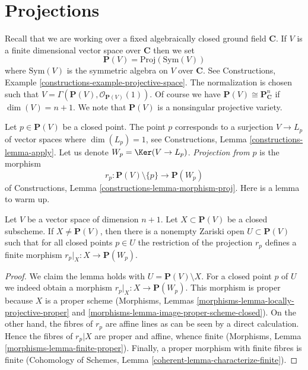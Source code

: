 \section{Projections}
\label{section-projection}

\noindent
Recall that we are working over a fixed algebraically closed ground field
$\mathbf{C}$. If $V$ is a finite dimensional vector space over $\mathbf{C}$
then we set
$$
\mathbf{P}(V) = \text{Proj}(\text{Sym}(V))
$$
where $\text{Sym}(V)$ is the symmetric algebra on $V$ over $\mathbf{C}$.
See Constructions, Example \ref{constructions-example-projective-space}.
The normalization is chosen such that
$V = \Gamma(\mathbf{P}(V), \mathcal{O}_{\mathbf{P}(V)}(1))$.
Of course we have $\mathbf{P}(V) \cong \mathbf{P}^n_{\mathbf{C}}$ if
$\dim(V) = n + 1$. We note that $\mathbf{P}(V)$ is a nonsingular projective
variety.

\medskip\noindent
Let $p \in \mathbf{P}(V)$ be a closed point. The point $p$ corresponds to a
surjection $V \to L_p$ of vector spaces where $\dim(L_p) = 1$, see
Constructions, Lemma \ref{constructions-lemma-apply}.
Let us denote $W_p = \Ker(V \to L_p)$.
{\it Projection from $p$} is the morphism
$$
r_p : \mathbf{P}(V) \setminus \{p\} \longrightarrow \mathbf{P}(W_p)
$$
of Constructions, Lemma \ref{constructions-lemma-morphism-proj}.
Here is a lemma to warm up.

\begin{lemma}
\label{lemma-projection-generically-finite}
Let $V$ be a vector space of dimension $n + 1$.
Let $X \subset \mathbf{P}(V)$ be a closed subscheme.
If $X \not = \mathbf{P}(V)$, then there is a nonempty Zariski open
$U \subset \mathbf{P}(V)$
such that for all closed points $p \in U$ the restriction
of the projection $r_p$ defines a finite morphism
$r_p|_X : X \to \mathbf{P}(W_p)$.
\end{lemma}

\begin{proof}
We claim the lemma holds with $U = \mathbf{P}(V) \setminus X$. For a closed
point $p$ of $U$ we indeed obtain a morphism $r_p|_X : X \to \mathbf{P}(W_p)$.
This morphism is proper because $X$ is a proper scheme
(Morphisms, Lemmas \ref{morphisms-lemma-locally-projective-proper} and
\ref{morphisms-lemma-image-proper-scheme-closed}). On the other hand, the
fibres of $r_p$ are affine lines as can be seen by a direct calculation.
Hence the fibres of $r_p|X$ are proper and affine, whence finite
(Morphisms, Lemma \ref{morphisms-lemma-finite-proper}).
Finally, a proper morphism with finite fibres is finite
(Cohomology of Schemes, Lemma \ref{coherent-lemma-characterize-finite}).
\end{proof}

